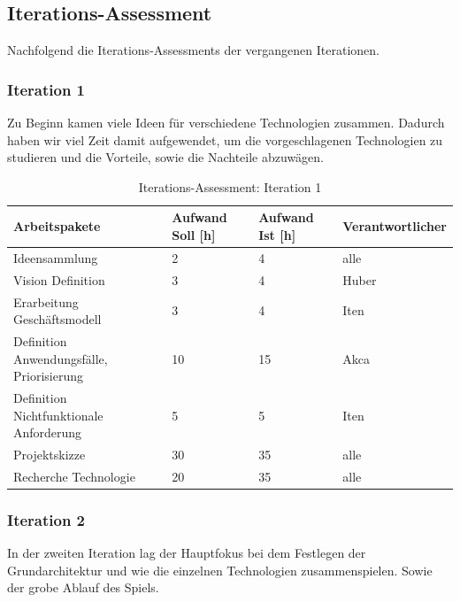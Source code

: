 \documentclass[11pt,ngerman]{article}
\begin{document}
\subsection{Iterations-Assessment}
Nachfolgend die Iterations-Assessments der vergangenen Iterationen.

\subsubsection{Iteration 1}

Zu Beginn kamen viele Ideen für verschiedene Technologien zusammen. Dadurch haben wir viel Zeit damit aufgewendet, um die vorgeschlagenen Technologien zu studieren und die Vorteile, sowie die Nachteile abzuwägen.

\begin{table}[H]
	\caption{Iterations-Assessment: Iteration 1}
	\begin{tabularx}{\textwidth}{X l l l}
		\toprule
		Arbeitspakete & Aufwand Soll [h] & Aufwand Ist [h] & Verantwortlicher \\
		\toprule
		Ideensammlung & 2 & 4 & alle \\
		Vision Definition & 3 & 4 & Huber \\
		Erarbeitung Geschäftsmodell & 3 & 4 & Iten \\
		Definition Anwendungsfälle, Priorisierung & 10 & 15 & Akca \\
		Definition Nichtfunktionale Anforderung & 5 & 5 & Iten \\
		Projektskizze & 30 & 35 & alle \\
		Recherche Technologie & 20 & 35 & alle \\
		\bottomrule
	\end{tabularx}
	\label{tab:Iterations-Assessment: Iteration 1}
\end{table}



\subsubsection{Iteration 2}

In der zweiten Iteration lag der Hauptfokus bei dem Festlegen der Grundarchitektur und wie die einzelnen Technologien zusammenspielen. Sowie der grobe Ablauf des Spiels.
\end{document}
